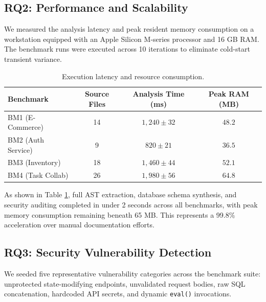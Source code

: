 \documentclass[a4paper,10pt]{article}
\begin{document}
\subsection{RQ2: Performance and Scalability}
\noindent
We measured the analysis latency and peak resident memory consumption on a workstation equipped with an Apple Silicon M-series processor and 16 GB RAM. The benchmark runs were executed across 10 iterations to eliminate cold-start transient variance.

\begin{table}[t]
\caption{Execution latency and resource consumption.}
\label{tab:performance}
\centering
\fontsize{8pt}{10pt}\selectfont
\begin{tabular}{lccc}
\toprule
\textbf{Benchmark} & \textbf{Source Files} & \textbf{Analysis Time (ms)} & \textbf{Peak RAM (MB)} \\
\midrule
BM1 (E-Commerce)   & 14 & $1,240 \pm 32$ & $48.2$ \\
BM2 (Auth Service) & 9  & $820 \pm 21$   & $36.5$ \\
BM3 (Inventory)    & 18 & $1,460 \pm 44$ & $52.1$ \\
BM4 (Task Collab)  & 26 & $1,980 \pm 56$ & $64.8$ \\
\bottomrule
\end{tabular}
\end{table}

As shown in Table \ref{tab:performance}, full AST extraction, database schema synthesis, and security auditing completed in under 2 seconds across all benchmarks, with peak memory consumption remaining beneath 65 MB. This represents a 99.8\% acceleration over manual documentation efforts.

\subsection{RQ3: Security Vulnerability Detection}
\noindent
We seeded five representative vulnerability categories across the benchmark suite: unprotected state-modifying endpoints, unvalidated request bodies, raw SQL concatenation, hardcoded API secrets, and dynamic \texttt{eval()} invocations.
\end{document}
